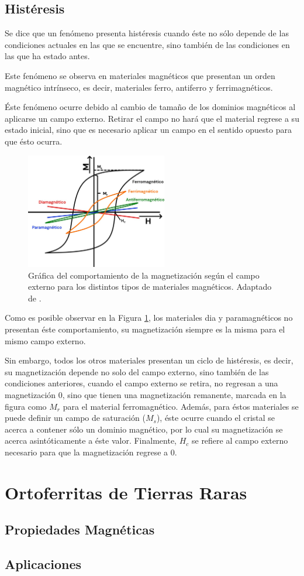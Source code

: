 \documentclass[../main.tex]{subfiles}
\begin{document}
\subsection{Histéresis}
Se dice que un fenómeno presenta histéresis cuando éste no sólo depende de las condiciones actuales en las que se encuentre, sino también de las condiciones en las que ha estado antes.

Este fenómeno se observa en materiales magnéticos que presentan un orden magnético intrínseco, es decir, materiales ferro, antiferro y ferrimagnéticos.

Éste fenómeno ocurre debido al cambio de tamaño de los dominios magnéticos al aplicarse un campo externo. Retirar el campo no hará que el material regrese a su estado inicial, sino que es necesario aplicar un campo en el sentido opuesto para que ésto ocurra.
\begin{figure}[H]
    \centering
    \includegraphics[width=0.55\textwidth]{fig/histeresis1.jpg}
    \caption{Gráfica del comportamiento de la magnetización según el campo externo para los distintos tipos de materiales magnéticos. Adaptado de \cite{Buschow2003}.}
    \label{diaghist}
\end{figure}
Como es posible observar en la Figura \ref{diaghist}, los materiales dia y paramagnéticos no presentan éste comportamiento, su magnetización siempre es la misma para el mismo campo externo. 

Sin embargo, todos los otros materiales presentan un ciclo de histéresis, es decir, su magnetización depende no solo del campo externo, sino también de las condiciones anteriores, cuando el campo externo se retira, no regresan a una magnetización 0, sino que tienen una magnetización remanente, marcada en la figura como $M_r$ para el material ferromagnético. Además, para éstos materiales se puede definir un campo de saturación ($M_s$), éste ocurre cuando el cristal se acerca a contener sólo un dominio magnético, por lo cual su magnetización se acerca asintóticamente a éste valor. Finalmente, $H_c$ se refiere al campo externo necesario para que la magnetización regrese a 0.
\section{Ortoferritas de Tierras Raras}

\subsection{Propiedades Magnéticas}

\subsection{Aplicaciones}
\end{document}
